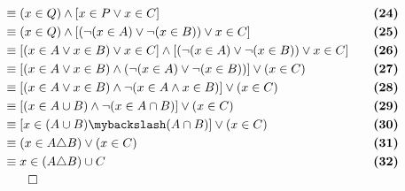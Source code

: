 \begin{alignat*}{2}
&\equiv (x \in Q) \wedge [x \in P \vee x \in C] && \quad \textbf{(24)}\\
&\equiv (x \in Q) \wedge [(\neg (x \in A) \vee \neg (x \in B)) \vee x \in C] && \quad \textbf{(25)}\\
&\equiv [(x \in A \vee x \in B) \vee x \in C] \wedge [(\neg (x \in A) \vee \neg (x \in B)) \vee x \in C] && \quad \textbf{(26)}\\
&\equiv [(x \in A \vee x \in B) \wedge (\neg (x \in A) \vee \neg (x \in B))] \vee (x \in C) && \quad \textbf{(27)}\\
&\equiv [(x \in A \vee x \in B) \wedge \neg (x \in A \wedge x \in B)] \vee (x \in C) && \quad \textbf{(28)}\\
&\equiv [(x \in A \cup B) \wedge \neg (x \in A \cap B)] \vee (x \in C) && \quad \textbf{(29)}\\
&\equiv [x \in (A \cup B) \mybackslash (A \cap B)] \vee (x \in C) && \quad \textbf{(30)}\\
&\equiv (x \in A \triangle B) \vee (x \in C) && \quad \textbf{(31)}\\
&\equiv x \in (A \triangle B) \cup C && \quad \textbf{(32)}\\
&\qed
\end{alignat*}

